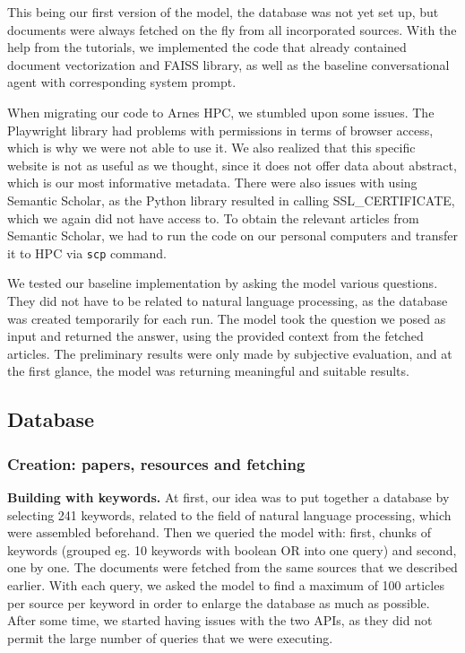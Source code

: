 \documentclass[fleqn,moreauthors,10pt]{ds_report}
\begin{document}
This being our first version of the model, the database was not yet set up, but documents were always fetched on the fly from all incorporated sources. With the help from the tutorials, we implemented the code that already contained document vectorization and FAISS library, as well as the baseline conversational agent with corresponding system prompt. 

When migrating our code to Arnes HPC, we stumbled upon some issues. The Playwright library had problems with permissions in terms of browser access, which is why we were not able to use it. We also realized that this specific website is not as useful as we thought, since it does not offer data about abstract, which is our most informative metadata. There were also issues with using Semantic Scholar, as the Python library resulted in calling SSL\_CERTIFICATE, which we again did not have access to. To obtain the relevant articles from Semantic Scholar, we had to run the code on our personal computers and transfer it to HPC via \texttt{scp} command.

We tested our baseline implementation by asking the model various questions. They did not have to be related to natural language processing, as the database was created temporarily for each run. The model took the question we posed as input and returned the answer, using the provided context from the fetched articles. The preliminary results were only made by subjective evaluation, and at the first glance, the model was returning meaningful and suitable results.

\subsection*{Database}

\subsubsection*{Creation: papers, resources and fetching}
\textbf{Building with keywords.} At first, our idea was to put together a database by selecting 241 keywords, related to the field of natural language processing, which were assembled beforehand. Then we queried the model with: first, chunks of keywords (grouped eg. 10 keywords with boolean OR into one query) and second, one by one. The documents were fetched from the same sources that we described earlier. With each query, we asked the model to find a maximum of 100 articles per source per keyword in order to enlarge the database as much as possible. After some time, we started having issues with the two APIs, as they did not permit the large number of queries that we were executing.
\end{document}
